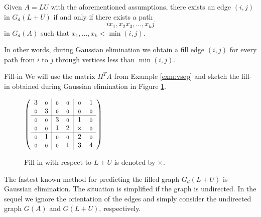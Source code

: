 \begin{theorem}\label{thr:gilbert}
Given $A=LU$ with the aforementioned assumptions, 
there exists an edge $(i,j)$ in $G_d(L+U)$ if and only if there exists a path
\[
ix_1, x_2x_3, \dots, x_kj
\]
in $G_d(A)$ such that $x_1,\dots,x_k<\min(i,j)$.
\end{theorem}
In other words, during Gaussian elimination we obtain a fill edge $(i,j)$ for
every path from $i$ to $j$ through vertices less than $\min(i,j)$.

\begin{example}{Fill-in}\label{exm:fill}
We will use the matrix $\Pi^TA$ from Example \ref{exm:vsep}  and sketch
the fill-in obtained during Gaussian elimination   in Figure \ref{fig:fill}.
\end{example}
\begin{figure}
 \centering
\begin{minipage}{.45\textwidth}
  \begin{center}
    $\left(
        \begin{array}{cc|cc|cc}
        3   & \scriptstyle{0} & \scriptstyle{0} & \scriptstyle{0} & \scriptstyle{0}   &  1  \\
        \scriptstyle{0} & 3   &  \scriptstyle{0}& \scriptstyle{0} & \scriptstyle{0} & \scriptstyle{0}   \\ \hline
        \scriptstyle{0} &  \scriptstyle{0}& 3   & \scriptstyle{0} &  1 & \scriptstyle{0} \\
        \scriptstyle{0} & \scriptstyle{0} &  1 &  2  & \times   & \scriptstyle{0} \\ \hline
        \scriptstyle{0}  & 1  & \scriptstyle{0} & \scriptstyle{0} & 2   & \scriptstyle{0}   \\
        \scriptstyle{0}   & \scriptstyle{0} & \scriptstyle{0} & 1   & 3 & 4   
        \end{array}
    \right)$
  \end{center}
\end{minipage}
    \caption{Fill-in with respect to $L+U$ is denoted by $\times$.}
    \label{fig:fill}
\end{figure}


The fastest known method for predicting the filled graph $G_d(L+U)$ is Gaussian elimination. 
The situation is simplified if the
 graph is undirected. 
In the sequel we ignore the orientation of the edges and simply consider
the undirected graph $G(A)$ and $G(L+U)$, respectively.

